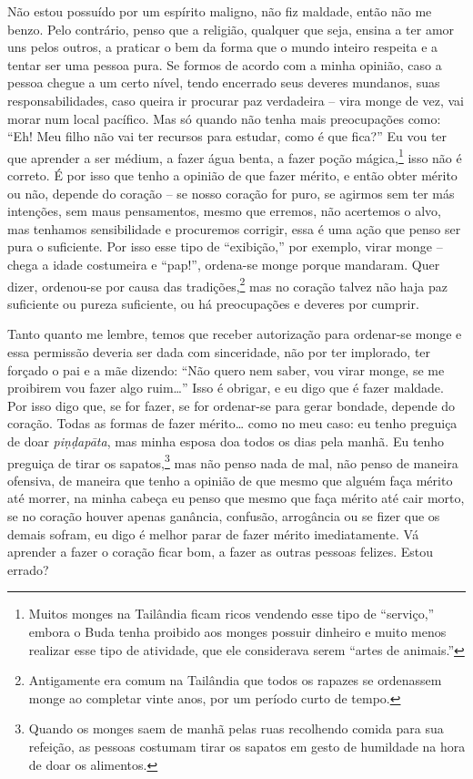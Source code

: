 Não estou possuído por um espírito maligno, não fiz maldade, então
não me benzo. Pelo contrário, penso que a religião, qualquer que seja,
ensina a ter amor uns pelos outros, a praticar o bem da forma que o
mundo inteiro respeita e a tentar ser uma pessoa pura. Se formos de
acordo com a minha opinião, caso a pessoa chegue a um certo nível,
tendo encerrado seus deveres mundanos, suas responsabilidades, caso
queira ir procurar paz verdadeira – vira monge de vez, vai morar num
local pacífico. Mas só quando não tenha mais preocupações como: “Eh!
Meu filho não vai ter recursos para estudar, como é que fica?” Eu vou
ter que aprender a ser médium, a fazer água benta, a fazer poção
mágica,\footnote{Muitos monges na Tailândia ficam ricos vendendo esse
tipo de “serviço,” embora o Buda tenha proibido aos monges possuir
dinheiro e muito menos realizar esse tipo de atividade, que ele
considerava serem “artes de animais.”} isso não é correto. É por isso
que tenho a opinião de que fazer mérito, e então obter mérito ou não,
depende do coração – se nosso coração for puro, se agirmos sem ter más
intenções, sem maus pensamentos, mesmo que erremos, não acertemos o
alvo, mas tenhamos sensibilidade e procuremos corrigir, essa é uma ação
que penso ser pura o suficiente. Por isso esse tipo de “exibição,” por
exemplo, virar monge – chega a idade costumeira e “pap!”, ordena-se
monge porque mandaram. Quer dizer, ordenou-se por causa das
tradições,\footnote{Antigamente era comum na Tailândia que todos os
rapazes se ordenassem monge ao completar vinte anos, por um período
curto de tempo.} mas no coração talvez não haja paz suficiente ou
pureza suficiente, ou há preocupações e deveres por cumprir. 

Tanto quanto me lembre, temos que receber autorização para
ordenar-se monge e essa permissão deveria ser dada com sinceridade, não
por ter implorado, ter forçado o pai e a mãe dizendo: “Não quero nem
saber, vou virar monge, se me proibirem vou fazer algo ruim\ldots{}” Isso é
obrigar, e eu digo que é fazer maldade. Por isso digo que, se for
fazer, se for ordenar-se para gerar bondade, depende do coração. Todas
as formas de fazer mérito\ldots{} como no meu caso: eu tenho preguiça de doar
\emph{piṇḍapāta}, mas minha esposa doa todos os dias pela manhã. Eu
tenho preguiça de tirar os sapatos,\footnote{Quando os monges saem de
manhã pelas ruas recolhendo comida para sua refeição, as pessoas
costumam tirar os sapatos em gesto de humildade na hora de doar os
alimentos.} mas não penso nada de mal, não penso de maneira ofensiva,
de maneira que tenho a opinião de que mesmo que alguém faça mérito até
morrer, na minha cabeça eu penso que mesmo que faça mérito até cair
morto, se no coração houver apenas ganância, confusão, arrogância ou se
fizer que os demais sofram, eu digo é melhor parar de fazer mérito
imediatamente. Vá aprender a fazer o coração ficar bom, a fazer as
outras pessoas felizes. Estou errado?

